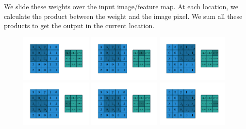 \documentclass{article}
\begin{document}
We slide these weights over the input image/feature map.
At each location, we calculate the product between the weight and the image pixel.
We sum all these products to get the output in the current location.
\begin{figure}[H]
    \centering
    \includegraphics[width=0.32\textwidth]{pdf/numerical_no_padding_no_strides_00.pdf}
    \includegraphics[width=0.32\textwidth]{pdf/numerical_no_padding_no_strides_01.pdf}
    \includegraphics[width=0.32\textwidth]{pdf/numerical_no_padding_no_strides_02.pdf}
    \includegraphics[width=0.32\textwidth]{pdf/numerical_no_padding_no_strides_03.pdf}
    \includegraphics[width=0.32\textwidth]{pdf/numerical_no_padding_no_strides_04.pdf}
    \includegraphics[width=0.32\textwidth]{pdf/numerical_no_padding_no_strides_05.pdf}

\end{figure}
\end{document}
